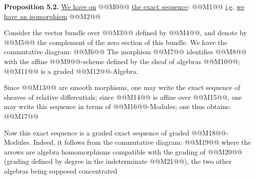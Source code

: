 \textbf{Proposition 5.2.} \uline{We have on} @@M0@@ \uline{the exact sequence}:
@@M1@@
\uline{i}.\uline{e}. \uline{we have an isomorphism}
@@M2@@

Consider the vector bundle over @@M3@@ defined by @@M4@@, and denote by @@M5@@ the complement of the zero section of this bundle. We have the commutative diagram:
@@M6@@
The morphism @@M7@@ identifies @@M8@@ with the affine @@M9@@-scheme defined by the sheaf of algebras @@M10@@; @@M11@@ is a graded @@M12@@-Algebra.

Since @@M13@@ are smooth morphisms, one may write the exact sequence of sheaves of relative differentials; since @@M14@@ is affine over @@M15@@, one may write this sequence in terms of @@M16@@-Modules; one thus obtains:
@@M17@@

Now this exact sequence is a graded exact sequence of graded @@M18@@-Modules. Indeed, it follows from the commutative diagram:
@@M19@@
where the arrows are algebra homomorphisms compatible with the grading of @@M20@@ (grading defined by degree in the indeterminate @@M21@@), the two other algebras being supposed concentrated
